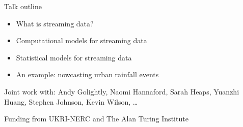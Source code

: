 \begin{frame}{Talk outline}
\protect\hypertarget{talk-outline}{}

\begin{itemize}
\tightlist
\item
  What is streaming data?
\item
  Computational models for streaming data
\item
  Statistical models for streaming data
\item
  An example: nowcasting urban rainfall events
\end{itemize}
\bigskip

Joint work with: Andy Golightly, Naomi Hannaford, Sarah Heaps, Yuanzhi Huang, Stephen Johnson, Kevin Wilson, \ldots

\bigskip

Funding from UKRI-NERC and The Alan Turing Institute

\end{frame}

